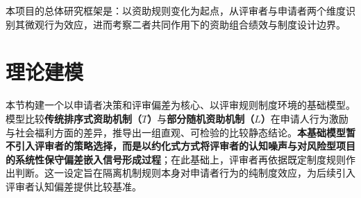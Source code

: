 



本项目的总体研究框架是：以资助规则变化为起点，从评审者与申请者两个维度识别其微观行为效应，进而考察二者共同作用下的资助组合绩效与制度设计边界。

\section{\textbf{理论建模}}

本节构建一个以申请者决策和评审偏差为核心、以评审规则制度环境的基础模型。模型比较\textbf{传统排序式资助机制（$T$）}与\textbf{部分随机资助机制（$L$）}在申请人行为激励与社会福利方面的差异，推导出一组直观、可检验的比较静态结论。\textbf{本基础模型暂不引入评审者的策略选择，而是以约化式方式将评审者的认知噪声与对风险型项目的系统性保守偏差嵌入信号形成过程}；在此基础上，评审者再依据既定制度规则作出判断。这一设定旨在隔离机制规则本身对申请者行为的纯制度效应，为后续引入评审者认知偏差提供比较基准。

